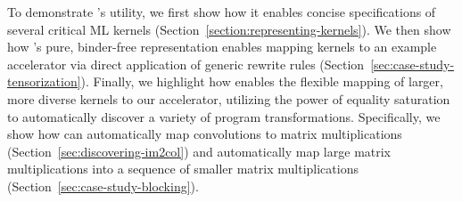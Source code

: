 %  
%  
%


To demonstrate \g's utility,
  we first show how it enables
  concise specifications of several
  critical ML kernels
  (Section~\ref{section:representing-kernels}).
We then show how
  \g's pure, binder-free
  representation enables mapping kernels
  to an example accelerator via
  direct application of generic rewrite rules
  (Section~\ref{sec:case-study-tensorization}).
Finally,
  we highlight how \g
  enables the
  flexible mapping of
  larger, more diverse kernels
  to our accelerator,
  utilizing the power
  of equality saturation
  to automatically discover
  a variety of program transformations.
Specifically,
  we show how \g can automatically
  map convolutions to matrix multiplications
  (Section~\ref{sec:discovering-im2col})
  and automatically
  map large matrix multiplications into a
  sequence of smaller matrix multiplications
  (Section~\ref{sec:case-study-blocking}).
  
